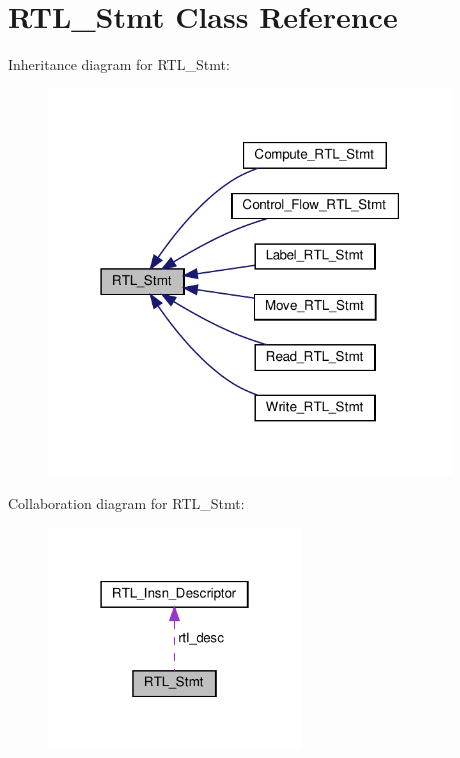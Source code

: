 \hypertarget{classRTL__Stmt}{}\section{R\+T\+L\+\_\+\+Stmt Class Reference}
\label{classRTL__Stmt}


Inheritance diagram for R\+T\+L\+\_\+\+Stmt\+:
\nopagebreak
\begin{figure}[H]
\begin{center}
\leavevmode
\includegraphics[width=303pt]{classRTL__Stmt__inherit__graph}
\end{center}
\end{figure}


Collaboration diagram for R\+T\+L\+\_\+\+Stmt\+:
\nopagebreak
\begin{figure}[H]
\begin{center}
\leavevmode
\includegraphics[width=190pt]{classRTL__Stmt__coll__graph}
\end{center}
\end{figure}
